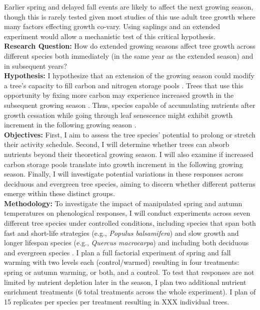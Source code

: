 \documentclass{article}
\begin{document}
Earlier spring and delayed fall events are likely to affect the next growing season, though this is rarely tested given most studies of this use adult tree growth where many factors effecting growth co-vary. Using saplings and an extended experiment would allow a mechanistic test of this critical hypothesis. \\  %
\textbf {Research Question:} How do extended growing seasons affect tree growth across different species both immediately (in the same year as the extended season) and in subsequent years? \\
\textbf {Hypothesis:} I hypothesize that an extension of the growing season could modify a tree’s capacity to fill carbon and nitrogen storage pools \citep{chapin_ecology_1990, lawrence_variable_2018}. Trees that use this opportunity by fixing more carbon may experience increased growth in the subsequent growing season \citep{landhausser_partitioning_2012, martens_first-year_2007}. Thus, species capable of accumulating nutrients after growth cessation while going through leaf senescence might exhibit growth increment in the following growing season \citep{schott_premature_2013}. \\
\textbf {Objectives:} First, I aim to assess the tree species' potential to prolong or stretch their activity schedule. Second, I will determine whether trees can absorb nutrients beyond their theoretical growing season. I will also examine if increased carbon storage pools translate into growth increment in the following growing season. Finally, I will investigate potential variations in these responses across deciduous and evergreen tree species, aiming to discern whether different patterns emerge within these distinct groups.\\
\textbf {Methodology:} To investigate the impact of manipulated spring and autumn temperatures on phenological responses, I will conduct experiments across seven different tree species under controlled conditions, including species that span both fast and short-life strategies (e.g., \emph{Populus balsamifera}) and slow growth and longer lifespan species (e.g., \emph{Quercus macrocarpa}) and including both deciduous and evergreen species \citep{jonsson_annual_2010}. I plan a full factorial experiment of spring and fall warming with two levels each (control/warmed) resulting in four treatments: spring or autumn warming, or both, and a control. To test that responses are not limited by nutrient depletion later in the season, I plan two additional nutrient enrichment treatments (6 total treatments across the whole experiment). I plan of 15 replicates per species per treatment \citep{siegel_collaborative_2009} resulting in XXX individual trees. %
\end{document}
